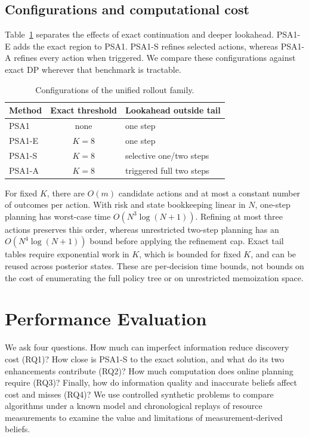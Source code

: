 \documentclass[conference]{IEEEtran}
\begin{document}
\subsection{Configurations and computational cost}
Table~\ref{tab:variants} separates the effects of exact continuation and deeper lookahead. PSA1-E adds the exact region to PSA1. PSA1-S refines selected actions, whereas PSA1-A refines every action when triggered. We compare these configurations against exact DP wherever that benchmark is tractable.
\begin{table}[t]
\caption{Configurations of the unified rollout family.}
\label{tab:variants}
\centering
\begin{tabular}{lcl}\hline
 Method & Exact threshold & Lookahead outside tail\\\hline
 PSA1 & none & one step\\
 PSA1-E & $K=8$ & one step\\
 PSA1-S & $K=8$ & selective one/two steps\\
 PSA1-A & $K=8$ & triggered full two steps\\\hline
\end{tabular}
\end{table}
For fixed $K$, there are $O(m)$ candidate actions and at most a constant number of outcomes per action. With risk and state bookkeeping linear in $N$, one-step planning has worst-case time $O(N^3\log(N+1))$. Refining at most three actions preserves this order, whereas unrestricted two-step planning has an $O(N^4\log(N+1))$ bound before applying the refinement cap. Exact tail tables require exponential work in $K$, which is bounded for fixed $K$, and can be reused across posterior states. These are per-decision time bounds, not bounds on the cost of enumerating the full policy tree or on unrestricted memoization space.

\section{Performance Evaluation}
\label{sec:eval}
We ask four questions. How much can imperfect information reduce discovery cost (RQ1)? How close is PSA1-S to the exact solution, and what do its two enhancements contribute (RQ2)? How much computation does online planning require (RQ3)? Finally, how do information quality and inaccurate beliefs affect cost and misses (RQ4)? We use controlled synthetic problems to compare algorithms under a known model and chronological replays of resource measurements to examine the value and limitations of measurement-derived beliefs.
\end{document}
